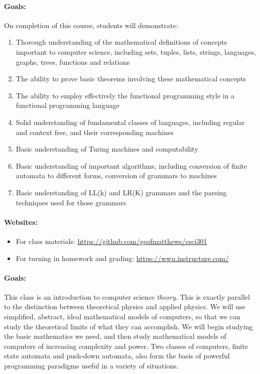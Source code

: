 \documentclass{article}
\begin{document}
\paragraph{Goals:}  On completion of this course, students will demonstrate:
\begin{enumerate}
\item
  Thorough understanding of the mathematical definitions of concepts
  important to computer science, including sets, tuples, lists, strings,
  languages, graphs, trees, functions and relations
\item
  The ability to prove basic theorems involving these
  mathematical concepts
\item
  The ability to employ effectively the functional programming style in a
  functional programming language
\item
  Solid understanding of fundamental classes of languages, including
  regular and context free, and their corresponding machines
\item
  Basic understanding of Turing machines and computability
\item
  Basic understanding of important algorithms, including conversion of
  finite automata to different forms, conversion of grammars to machines
\item
  Basic understanding of LL(k) and LR(K) grammars and the parsing
  techniques used for those grammars
\end{enumerate}

\paragraph{Websites:}
\begin{itemize}
\item For class materials:
  \url{https://github.com/geofmatthews/csci301}
\item For turning in homework and
  grading: \url{https://wwu.instructure.com/} 
\end{itemize}


\paragraph{Goals:} This class is an introduction to computer science {\em
  theory}.  This is exactly parallel to the distinction between
theoretical physics and applied physics.  We will use simplified,
abstract, ideal mathematical models of computers, so that we can study
the theoretical limits of what they can accomplish.  We will begin
studying the basic mathematics we need, and then study mathematical
models of computers of increasing complexity and power.  Two classes
of computers, finite state automata and push-down automata, also form
the basis of powerful programming paradigms useful in a variety of
situations.
\end{document}

